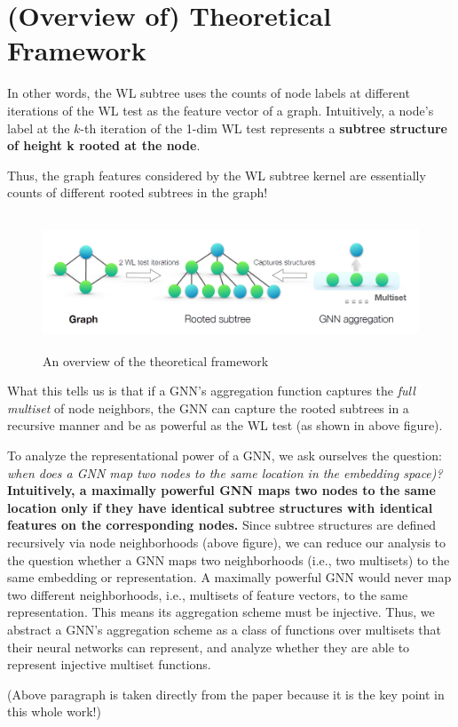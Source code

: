\newpage
\section{(Overview of) Theoretical Framework}

In other words, the WL subtree uses the counts of node labels at different iterations of the WL test as the feature vector of a graph.
Intuitively, a node’s label at the $k$-th iteration of the 1-dim WL test represents a {\bf subtree structure of height k rooted at the node}.

Thus, the graph features considered by the WL subtree kernel are essentially counts of different rooted subtrees in the graph!

\begin{figure}[hbt!]
\centering
	\includegraphics[height=4cm]{preliminaries/fig/fig2.png}
	\caption{An overview of the theoretical framework}
\end{figure}

What this tells us is that if a GNN's aggregation function captures the {\it full multiset} of node neighbors, the GNN can capture the rooted subtrees in a recursive manner and be as powerful as the WL test (as shown in above figure).

To analyze the representational power of a GNN, we ask ourselves the question: {\it when does a GNN map two nodes to the same location in the embedding space)? }
{\bf Intuitively, a maximally powerful GNN maps two nodes to the same location only if they have identical subtree structures with identical features on the corresponding nodes.}
Since subtree structures are defined recursively via node neighborhoods (above figure), we can reduce our analysis to the question whether a GNN maps two neighborhoods (i.e., two multisets) to the same embedding or representation.
A maximally powerful GNN would never map two different neighborhoods, i.e., multisets of feature vectors, to the same representation.
This means its aggregation scheme must be injective. Thus, we abstract a GNN’s aggregation scheme as a class of functions over multisets that their neural networks can represent, and analyze whether they are able to represent injective multiset functions.

(Above paragraph is taken directly from the paper because it is the key point in this whole work!)
